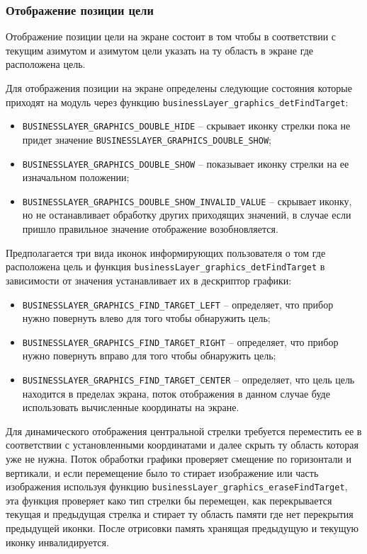 \subsubsection{Отображение позиции цели}

Отображение позиции цели на экране состоит в том чтобы в соответствии с текущим азимутом и азимутом цели указать на ту область в экране где расположена цель.

Для отображения позиции на экране определены следующие состояния которые приходят на модуль через функцию \lstinline{businessLayer_graphics_detFindTarget}:

\begin{itemize}
    \item \lstinline{BUSINESSLAYER_GRAPHICS_DOUBLE_HIDE} -- скрывает иконку стрелки пока не придет значение \lstinline{BUSINESSLAYER_GRAPHICS_DOUBLE_SHOW};
    \item \lstinline{BUSINESSLAYER_GRAPHICS_DOUBLE_SHOW} -- показывает иконку стрелки на ее изначальном положении;
    \item \lstinline{BUSINESSLAYER_GRAPHICS_DOUBLE_SHOW_INVALID_VALUE} -- скрывает иконку, но не останавливает обработку других приходящих значений, в случае если пришло правильное значение
    отображение возобновляется.
\end{itemize}

Предполагается три вида иконок информирующих пользователя о том где расположена цель и функция \lstinline{businessLayer_graphics_detFindTarget} в зависимости от значения устанавливает их
в дескриптор графики:

\begin{itemize}
    \item \lstinline{BUSINESSLAYER_GRAPHICS_FIND_TARGET_LEFT} -- определяет, что прибор нужно повернуть влево для того чтобы обнаружить цель;
    \item \lstinline{BUSINESSLAYER_GRAPHICS_FIND_TARGET_RIGHT} -- определяет, что прибор нужно повернуть вправо для того чтобы обнаружить цель; 
    \item \lstinline{BUSINESSLAYER_GRAPHICS_FIND_TARGET_CENTER} -- определяет, что цель цель находится в пределах экрана, поток отображения в данном случае буде использовать
    вычисленные координаты на экране.
\end{itemize}

Для динамического отображения центральной стрелки требуется переместить ее в соответствии с установленными координатами и далее скрыть ту область которая уже не нужна.
Поток обработки графики проверяет смещение по горизонтали и вертикали, и если перемещение было то стирает изображение или часть изображения используя функцию
\lstinline{businessLayer_graphics_eraseFindTarget}, эта функция проверяет како тип стрелки бы перемещен, как перекрывается текущая и предыдущая стрелка и стирает
ту область памяти где нет перекрытия предыдущей иконки. 
После отрисовки память хранящая предыдущую и текущую иконку инвалидируется. 

